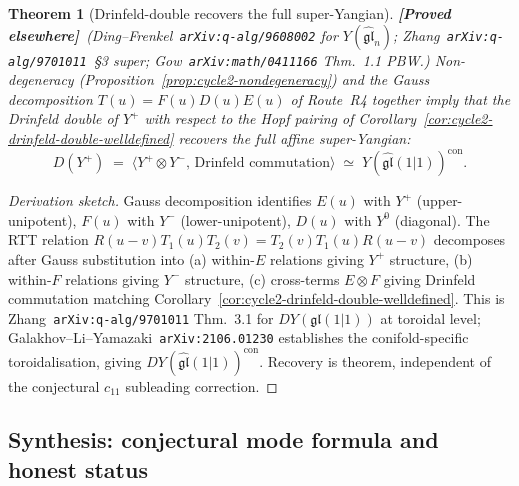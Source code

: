 \documentclass[11pt]{amsart}
\newtheorem{theorem}{Theorem}[section]
\theoremstyle{definition}
\providecommand{\fgl}{\mathfrak{gl}}
\providecommand{\ClaimStatusProvedElsewhere}{\textbf{\textsf{[Proved elsewhere]}}}
\begin{document}
\begin{theorem}[Drinfeld-double recovers the full super-Yangian]
\label{thm:cycle5-drinfeld-double-super-yangian}
\ClaimStatusProvedElsewhere\
\emph{(Ding--Frenkel~\texttt{arXiv:q-alg/9608002} for $Y(\widehat{\fgl}_n)$;
Zhang~\texttt{arXiv:q-alg/9701011}~\S3 super;
Gow~\texttt{arXiv:math/0411166} Thm.~1.1 PBW.)}
Non-degeneracy (Proposition~\ref{prop:cycle2-nondegeneracy}) and the
Gauss decomposition $T(u) = F(u) D(u) E(u)$ of Route~R4 together imply
that the Drinfeld double of $Y^+$ with respect to the Hopf pairing of
Corollary~\ref{cor:cycle2-drinfeld-double-welldefined} recovers the full
affine super-Yangian:
\[
  D(Y^+) \;=\; \bigl\langle Y^+ \otimes Y^-,\,\text{Drinfeld commutation}
  \bigr\rangle
  \;\simeq\; Y(\widehat{\fgl}(1|1))^{\mathrm{con}}.
\]
\end{theorem}

\begin{proof}[Derivation sketch]
Gauss decomposition identifies $E(u)$ with $Y^+$ (upper-unipotent),
$F(u)$ with $Y^-$ (lower-unipotent), $D(u)$ with $Y^0$ (diagonal). The
RTT relation $R(u-v) T_1(u) T_2(v) = T_2(v) T_1(u) R(u-v)$ decomposes
after Gauss substitution into (a) within-$E$ relations giving $Y^+$
structure, (b) within-$F$ relations giving $Y^-$ structure, (c)
cross-terms $E\otimes F$ giving Drinfeld commutation matching
Corollary~\ref{cor:cycle2-drinfeld-double-welldefined}. This is
Zhang~\texttt{arXiv:q-alg/9701011} Thm.~3.1 for $DY(\fgl(1|1))$ at
toroidal level; Galakhov--Li--Yamazaki~\texttt{arXiv:2106.01230}
establishes the conifold-specific toroidalisation, giving
$DY(\widehat{\fgl}(1|1))^{\mathrm{con}}$. Recovery is theorem,
independent of the conjectural $c_{11}$ subleading correction.
\end{proof}

\subsection{Synthesis: conjectural mode formula and honest status}
\label{subsec:hopf-pairing-synthesis}
\end{document}
